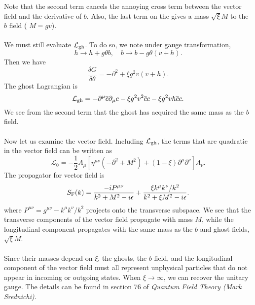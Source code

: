 Note that the second term cancels the annoying cross term between the vector field and the derivative of $b$. Also, the last term on the gives a mass $\sqrt{\xi}M$ to the $b$ field ( $M = gv$).
\\ \\
We must still evaluate $\mathcal{L}_{\rm gh}$. To do so, we note under gauge transformation,
\[h \to h + g\theta b , \quad b \to b - g\theta(v+h).\]
Then we have
\[\frac{\delta G}{\delta \theta} = -\partial^2 + \xi g^2 v(v+h).\]
The ghost Lagrangian is
\[\mathcal{L}_{\rm gh} = -\partial^{\mu}\overline{c}\partial_{\mu}c - \xi g^2v^2\overline{c}c - \xi g^2 vh\overline{c}c.\]
We see from the second term that the ghost has acquired the same mass as the $b$ field.
\\ \\
Now let us examine the vector field. Including $\mathcal{L}_{\rm gh}$, the terms that are quadratic in the vector field can be written as
\[\mathcal{L}_0 = - \frac{1}{2}A_{\mu} \left[ \eta^{\mu\nu}(-\partial^2 + M^2) + (1 - \xi)\partial^{\mu}\partial^{\nu} \right] A_{\nu}.\]
The propagator for vector field is
\[S_{\rm F}(k) = \frac{-iP^{\mu\nu}}{k^2+M^2-i\epsilon} + \frac{\xi k^{\mu}k^{\nu}/k^2}{k^2+ \xi M^2-i\epsilon}.\]
where $P^{\mu\nu} = g^{\mu\nu} - k^{\mu}k^{\nu}/k^2$ projects onto the transverse subspace. We see that the transverse components of the vector field propagate with mass $M$, while the longitudinal component propagates with the same mass as the $b$ and ghost fields, $\sqrt{\xi}M$.
\\ \\
Since their masses depend on $\xi$, the ghosts, the $b$ field, and the longitudinal component of the vector field must all represent unphysical particles that do not appear in incoming or outgoing states. When $\xi \to \infty$, we can recover the unitary gauge. The details can be found in section 76 of \emph{Quantum Field Theory (Mark Srednichi)}.

